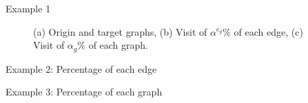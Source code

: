 \documentclass[slidestop,usepdftitle=false,10pt]{beamer}
\begin{document}
	\begin{frame}{Example 1}
    \begin{figure}
        \centering
        \caption{(a) Origin and target graphs, (b) Visit of $\alpha^{e_g}\%$ of each edge, (c) Visit of $\alpha_g\%$ of each graph.}
        \label{fig:illustrative}
    \end{figure}	
    \end{frame}
    
    \begin{frame}{Example 2: Percentage of each edge}
    	\begin{center}
		\end{center}
    \end{frame}

    \begin{frame}{Example 3: Percentage of each graph}
    	\begin{center}
		\end{center}
    \end{frame}
	
\end{document}

